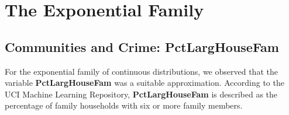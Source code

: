 \documentclass[12pt, letterpaper]{report}
\begin{document}
\maketitle
\chapter{The Exponential Family}
\section{Communities and Crime: PctLargHouseFam}

For the exponential family of continuous distributions, we observed that the variable \textbf{PctLargHouseFam} was a suitable approximation. 
According to the UCI Machine Learning Repository, \textbf{PctLargHouseFam} is described as the percentage of family households with six or more family members. 
\end{document}
